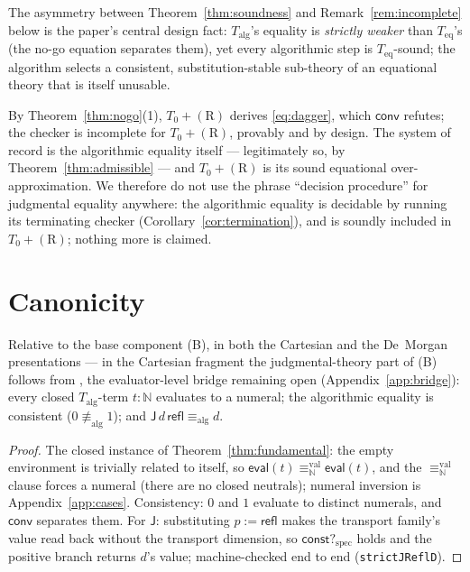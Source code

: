 \documentclass{lmcs}
\newcommand{\refl}{\mathsf{refl}}
\newcommand{\J}{\mathsf{J}}
\newcommand{\aconv}{\equiv_{\mathrm{alg}}}
\newcommand{\valeq}{\equiv^{\mathrm{val}}}
\newcommand{\evalop}{\mathsf{eval}}
\newcommand{\constspec}{\mathsf{const?}_{\mathrm{spec}}}
\newcommand{\convop}{\mathsf{conv}}
\begin{document}
\noindent The asymmetry between Theorem~\ref{thm:soundness} and
Remark~\ref{rem:incomplete} below is the paper's central design
fact: $T_{\mathrm{alg}}$'s equality is \emph{strictly weaker} than
$T_{\mathrm{eq}}$'s (the no-go equation separates them), yet every
algorithmic step is $T_{\mathrm{eq}}$-sound; the algorithm selects a
consistent, substitution-stable sub-theory of an equational theory
that is itself unusable.

\begin{rem}\label{rem:incomplete}
  By Theorem~\ref{thm:nogo}(1), $T_0+(\mathrm{R})$ derives
  \eqref{eq:dagger}, which $\convop$ refutes; the checker is
  incomplete for $T_0+(\mathrm{R})$, provably and by design.  The
  system of record is the algorithmic equality itself ---
  legitimately so, by Theorem~\ref{thm:admissible} ---
  and $T_0+(\mathrm{R})$ is its sound equational
  over-approximation.  We therefore do not use the phrase ``decision
  procedure'' for judgmental equality anywhere: the algorithmic
  equality is decidable by running its terminating checker
  (Corollary~\ref{cor:termination}), and is soundly included in
  $T_0+(\mathrm{R})$; nothing more is claimed.
\end{rem}

\section{Canonicity}
\label{sec:canonicity}

\begin{thm}[Canonicity]\label{thm:canonicity}
  Relative to the base component (B), in both the Cartesian and the
  De~Morgan presentations --- in the Cartesian fragment the
  judgmental-theory part of (B) follows from \cite{SterlingAngiuli},
  the evaluator-level bridge remaining open
  (Appendix~\ref{app:bridge}): every closed $T_{\mathrm{alg}}$-term
  $t : \mathbb{N}$ evaluates to a numeral; the algorithmic equality
  is consistent ($0 \not\aconv 1$); and $\J\,d\,\refl \aconv d$.
\end{thm}
\begin{proof}
  The closed instance of Theorem~\ref{thm:fundamental}: the empty
  environment is trivially related to itself, so
  $\evalop(t) \valeq_{\mathbb{N}} \evalop(t)$, and the
  $\valeq_{\mathbb{N}}$ clause forces a numeral (there are no closed
  neutrals); numeral inversion is
  Appendix~\ref{app:cases}.  Consistency: $0$ and $1$ evaluate to
  distinct numerals, and $\convop$ separates them.  For $\J$:
  substituting $p := \refl$ makes the transport family's value
  read back without the transport dimension, so
  $\constspec$ holds and the positive branch returns $d$'s value;
  machine-checked end to end (\texttt{strictJReflD}).
\end{proof}
\end{document}
